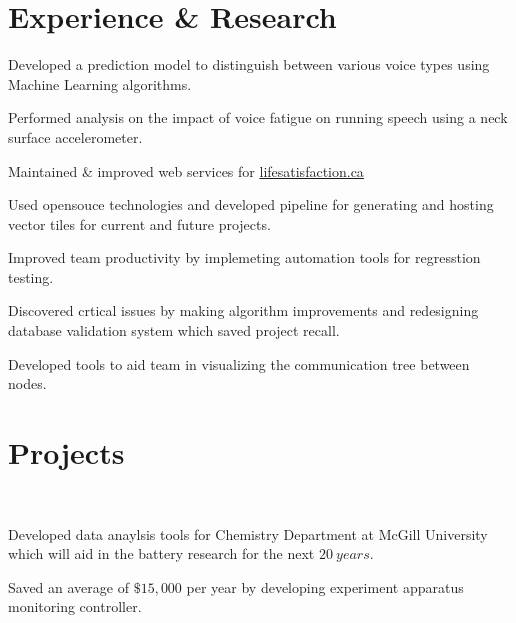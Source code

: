 \documentclass[]{allanwang-resume}
\begin{document}
\begin{minipage}[t]{0.66\textwidth}
	
	\section{Experience \& Research}

	\vspace{\topsep}
	\begin{tightemize}
		\item Developed a prediction model to distinguish between various voice types using Machine Learning algorithms.  
		\item Performed analysis on the impact of voice fatigue on running speech using a neck surface accelerometer.
	\end{tightemize}

	\begin{tightemize}
		\item Maintained \& improved  web services for \href{http://lifesatisfaction.ca}{lifesatisfaction.ca}
		\item Used opensouce technologies and developed pipeline for generating and hosting vector tiles for current and future projects.
	\end{tightemize}

	\begin{tightemize}
		\item Improved team productivity by implemeting automation tools for regresstion testing.  
		\item Discovered crtical issues by making algorithm improvements and redesigning database validation system which saved project recall.
		\item Developed tools to aid team in visualizing the communication tree between nodes.
	\end{tightemize}

	\sectionsep
	\section{Projects}

	 \\
	\begin{tightemize}
		\item Developed data anaylsis tools for Chemistry Department at McGill University which will aid in the battery research for the next $20 \ years$. 
  		\item Saved an average of $\$15,000$ per year by developing experiment apparatus monitoring controller. 
	\end{tightemize}


\end{minipage}
\end{document}
